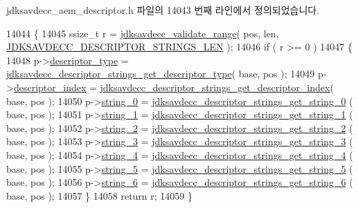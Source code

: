 jdksavdecc\+\_\+aem\+\_\+descriptor.\+h 파일의 14043 번째 라인에서 정의되었습니다.


\begin{DoxyCode}
14044 \{
14045     ssize\_t r = \hyperlink{group__util_ga9c02bdfe76c69163647c3196db7a73a1}{jdksavdecc\_validate\_range}( pos, len, 
      \hyperlink{group__descriptor__strings_ga1a0c88a9f0306c420ea4d28e147f400e}{JDKSAVDECC\_DESCRIPTOR\_STRINGS\_LEN} );
14046     \textcolor{keywordflow}{if} ( r >= 0 )
14047     \{
14048         p->\hyperlink{structjdksavdecc__descriptor__strings_ab7c32b6c7131c13d4ea3b7ee2f09b78d}{descriptor\_type} = 
      \hyperlink{group__descriptor__strings_gaefaeb02e3e054cbf2e4978af56765514}{jdksavdecc\_descriptor\_strings\_get\_descriptor\_type}( base, 
      pos );
14049         p->\hyperlink{structjdksavdecc__descriptor__strings_a042bbc76d835b82d27c1932431ee38d4}{descriptor\_index} = 
      \hyperlink{group__descriptor__strings_ga4460bc1890e0e4f39f439389987cb515}{jdksavdecc\_descriptor\_strings\_get\_descriptor\_index}( base,
       pos );
14050         p->\hyperlink{structjdksavdecc__descriptor__strings_a5dd7040ccaf4a1f44c30a7b0be194876}{string\_0} = \hyperlink{group__descriptor__strings_ga25ee0abe2a7ea4b9c4a8db0406eaf751}{jdksavdecc\_descriptor\_strings\_get\_string\_0}
      ( base, pos );
14051         p->\hyperlink{structjdksavdecc__descriptor__strings_a74069f3a05ccbf123fc33d25e826408f}{string\_1} = \hyperlink{group__descriptor__strings_gaf170c1a7c40a8104560b1a5be607bffb}{jdksavdecc\_descriptor\_strings\_get\_string\_1}
      ( base, pos );
14052         p->\hyperlink{structjdksavdecc__descriptor__strings_a2faecc14963d86b076a4a99a19794698}{string\_2} = \hyperlink{group__descriptor__strings_ga8f855f3da55d595b0c2728c3e9c784eb}{jdksavdecc\_descriptor\_strings\_get\_string\_2}
      ( base, pos );
14053         p->\hyperlink{structjdksavdecc__descriptor__strings_a8d22d22c70580e2881107d33d5699668}{string\_3} = \hyperlink{group__descriptor__strings_ga3a8b9207c916e4b017ac8d0055943f99}{jdksavdecc\_descriptor\_strings\_get\_string\_3}
      ( base, pos );
14054         p->\hyperlink{structjdksavdecc__descriptor__strings_a12315da39ae0832d37bc88da374e32b7}{string\_4} = \hyperlink{group__descriptor__strings_ga6a566c18e4a6ac8dc732e548aa99a5a4}{jdksavdecc\_descriptor\_strings\_get\_string\_4}
      ( base, pos );
14055         p->\hyperlink{structjdksavdecc__descriptor__strings_a6f6720d47d1d4d6896b173f8a3509c58}{string\_5} = \hyperlink{group__descriptor__strings_ga920701c73b5fc0591c83c533dfd503ab}{jdksavdecc\_descriptor\_strings\_get\_string\_5}
      ( base, pos );
14056         p->\hyperlink{structjdksavdecc__descriptor__strings_a00c3c7fc6e427751d1a54b0d38513ad3}{string\_6} = \hyperlink{group__descriptor__strings_ga3fe6b3d1db63f7b86722dcc7860ec81b}{jdksavdecc\_descriptor\_strings\_get\_string\_6}
      ( base, pos );
14057     \}
14058     \textcolor{keywordflow}{return} r;
14059 \}
\end{DoxyCode}



